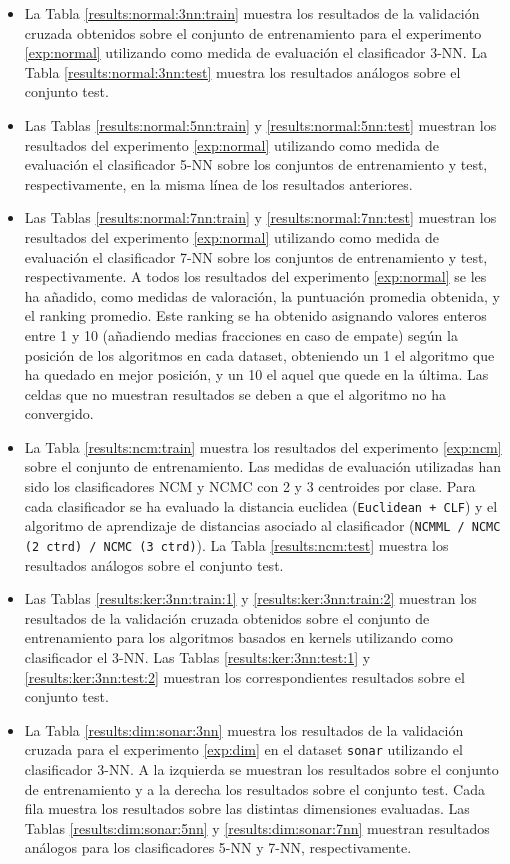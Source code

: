 \begin{itemize}
    \item La Tabla \ref{results:normal:3nn:train} muestra los resultados de la validación cruzada obtenidos sobre el conjunto de entrenamiento para el experimento \ref{exp:normal} utilizando como medida de evaluación el clasificador 3-NN. La Tabla \ref{results:normal:3nn:test} muestra los resultados análogos sobre el conjunto test.
    \item Las Tablas \ref{results:normal:5nn:train} y \ref{results:normal:5nn:test} muestran los resultados del experimento \ref{exp:normal} utilizando como medida de evaluación el clasificador 5-NN sobre los conjuntos de entrenamiento y test, respectivamente, en la misma línea de los resultados anteriores.
    \item Las Tablas \ref{results:normal:7nn:train} y \ref{results:normal:7nn:test} muestran los resultados del experimento \ref{exp:normal} utilizando como medida de evaluación el clasificador 7-NN sobre los conjuntos de entrenamiento y test, respectivamente. A todos los resultados del experimento \ref{exp:normal} se les ha añadido, como medidas de valoración, la puntuación promedia obtenida, y el ranking promedio. Este ranking se ha obtenido asignando valores enteros entre 1 y 10 (añadiendo medias fracciones en caso de empate) según la posición de los algoritmos en cada dataset, obteniendo un 1 el algoritmo que ha quedado en mejor posición, y un 10 el aquel que quede en la última. Las celdas que no muestran resultados se deben a que el algoritmo no ha convergido.
    \item La Tabla \ref{results:ncm:train} muestra los resultados del experimento \ref{exp:ncm} sobre el conjunto de entrenamiento. Las medidas de evaluación utilizadas han sido los clasificadores NCM y NCMC con 2 y 3 centroides por clase. Para cada clasificador se ha evaluado la distancia euclidea (\texttt{Euclidean + CLF}) y el algoritmo de aprendizaje de distancias asociado al clasificador (\texttt{NCMML / NCMC (2 ctrd) / NCMC (3 ctrd)}). La Tabla \ref{results:ncm:test} muestra los resultados análogos sobre el conjunto test.
    \item Las Tablas \ref{results:ker:3nn:train:1} y \ref{results:ker:3nn:train:2} muestran los resultados de la validación cruzada obtenidos sobre el conjunto de entrenamiento para los algoritmos basados en kernels utilizando como clasificador el 3-NN. Las Tablas \ref{results:ker:3nn:test:1} y \ref{results:ker:3nn:test:2} muestran los correspondientes resultados sobre el conjunto test.
    \item La Tabla \ref{results:dim:sonar:3nn} muestra los resultados de la validación cruzada para el experimento \ref{exp:dim} en el dataset \texttt{sonar} utilizando el clasificador 3-NN. A la izquierda se muestran los resultados sobre el conjunto de entrenamiento y a la derecha los resultados sobre el conjunto test. Cada fila muestra los resultados sobre las distintas dimensiones evaluadas. Las Tablas \ref{results:dim:sonar:5nn} y \ref{results:dim:sonar:7nn} muestran resultados análogos para los clasificadores 5-NN y 7-NN, respectivamente.

\end{itemize}
